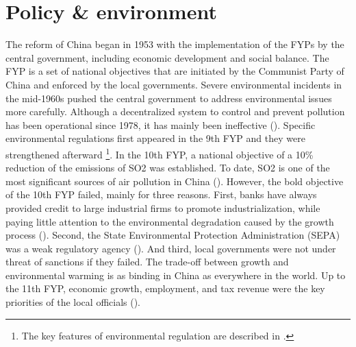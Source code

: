 \documentclass[12pt]{article}
\begin{document}
\section{Policy \& environment} \label{sec:Policy}

The reform of China began in 1953 with the implementation of the FYPs by the central government, including economic development and social balance. The FYP is a set of national objectives that are initiated by the Communist Party of China and enforced by the local governments. Severe environmental incidents in the mid-1960s pushed the central government to address environmental issues more carefully. Although a decentralized system to control and prevent pollution has been operational since 1978, it has mainly been ineffective (\cite{Xu2009-yw}). Specific environmental regulations first appeared in the 9th FYP and they were strengthened afterward \footnote{The key features of environmental regulation are described in \cite{Xu2011-sw}.}. In the 10th FYP, a national objective of a 10\% reduction of the emissions of SO2 was established. To date, SO2 is one of the most significant sources of air pollution in China (\cite{Yan2017-le}). However, the bold objective of the 10th FYP failed, mainly for three reasons. First, banks have always provided credit to large industrial firms to promote industrialization, while paying little attention to the environmental degradation caused by the growth process (\cite{The_World_Bank2008-pn}). Second, the State Environmental Protection Administration (SEPA) was a weak regulatory agency (\cite{Stoerk2018-mx}). And third, local governments were not under threat of sanctions if they failed. The trade-off between growth and environmental warming is as binding in China as everywhere in the world. Up to the 11th FYP, economic growth, employment, and tax revenue were the key priorities of the local officials (\cite{Jiang2014-pf, Chen2018-ki}).
\end{document}
